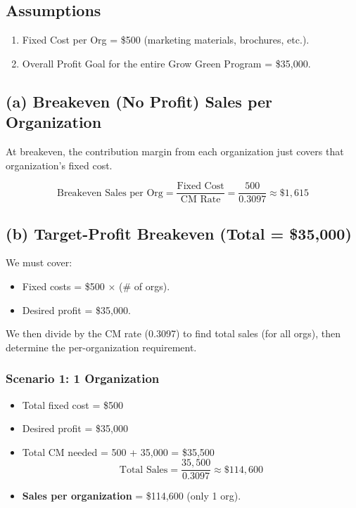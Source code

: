 \documentclass[12pt]{article}
\begin{document}
\subsection*{Assumptions}
\begin{enumerate}
    \item Fixed Cost per Org = \$500 (marketing materials, brochures, etc.).
    \item Overall Profit Goal for the entire Grow Green Program = \$35,000.
\end{enumerate}

\subsection*{(a) Breakeven (No Profit) Sales per Organization}

At breakeven, the contribution margin from each organization just covers that organization’s fixed cost.

\[
\text{Breakeven Sales per Org} 
= \frac{\text{Fixed Cost}}{\text{CM Rate}} 
= \frac{500}{0.3097} 
\approx \$1{,}615
\]

\subsection*{(b) Target-Profit Breakeven (Total = \$35,000)}

We must cover:
\begin{itemize}
    \item Fixed costs = \$500 $\times$ (\# of orgs).
    \item Desired profit = \$35,000.
\end{itemize}
We then divide by the CM rate (0.3097) to find total sales (for all orgs), then determine the per-organization requirement.

\subsubsection*{Scenario 1: 1 Organization}
\begin{itemize}
    \item Total fixed cost = \$500
    \item Desired profit = \$35,000
    \item Total CM needed = 500 + 35{,}000 = \$35{,}500
\[
\text{Total Sales} 
= \frac{35{,}500}{0.3097} 
\approx \$114{,}600
\]
\item \textbf{Sales per organization} = \$114{,}600 (only 1 org).
\end{itemize}
\end{document}

